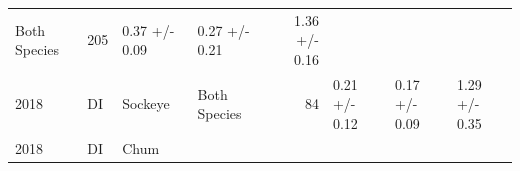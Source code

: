 \documentclass[fleqn,10pt]{wlpeerj} %
\begin{document}
\begin{longtable}[]{@{}llllrlll@{}}
\begin{minipage}[t]{0.11\columnwidth}
Both Species\strut
\end{minipage} & \begin{minipage}[t]{0.04\columnwidth}\raggedleft\strut
205\strut
\end{minipage} & \begin{minipage}[t]{0.14\columnwidth}\raggedright\strut
0.37 +/- 0.09\strut
\end{minipage} & \begin{minipage}[t]{0.14\columnwidth}\raggedright\strut
0.27 +/- 0.21\strut
\end{minipage} & \begin{minipage}[t]{0.14\columnwidth}\raggedright\strut
1.36 +/- 0.16\strut
\end{minipage}\tabularnewline
\begin{minipage}[t]{0.09\columnwidth}\raggedright\strut
2018\strut
\end{minipage} & \begin{minipage}[t]{0.06\columnwidth}\raggedright\strut
DI\strut
\end{minipage} & \begin{minipage}[t]{0.06\columnwidth}\raggedright\strut
Sockeye\strut
\end{minipage} & \begin{minipage}[t]{0.11\columnwidth}\raggedright\strut
Both Species\strut
\end{minipage} & \begin{minipage}[t]{0.04\columnwidth}\raggedleft\strut
84\strut
\end{minipage} & \begin{minipage}[t]{0.14\columnwidth}\raggedright\strut
0.21 +/- 0.12\strut
\end{minipage} & \begin{minipage}[t]{0.14\columnwidth}\raggedright\strut
0.17 +/- 0.09\strut
\end{minipage} & \begin{minipage}[t]{0.14\columnwidth}\raggedright\strut
1.29 +/- 0.35\strut
\end{minipage}\tabularnewline
\begin{minipage}[t]{0.09\columnwidth}\raggedright\strut
2018\strut
\end{minipage} & \begin{minipage}[t]{0.06\columnwidth}\raggedright\strut
DI\strut
\end{minipage} & \begin{minipage}[t]{0.06\columnwidth}\raggedright\strut
Chum\strut
\end{minipage} & \begin{minipage}[t]{0.11\columnwidth}\raggedright\strut

\end{minipage}
\end{longtable}
\end{document}
